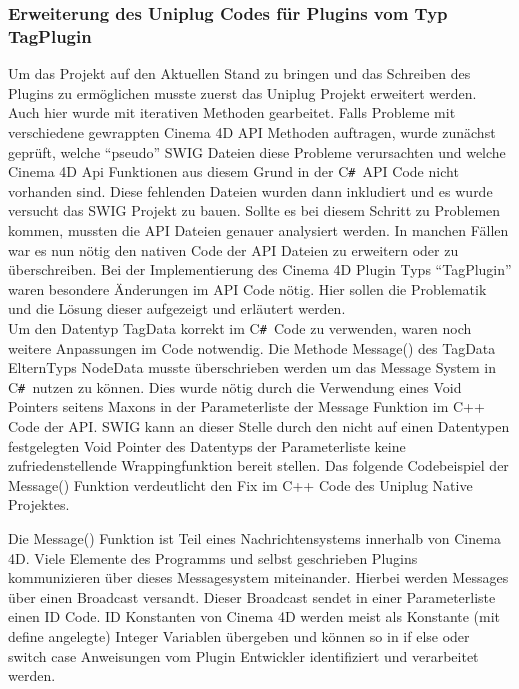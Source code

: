 \documentclass[pagesize, paper=a4, fontsize=12pt, titlepage=true, headings=small, headnosepline, abstractoff, liststotoc, nochapterprefix, plainheadsepline, twoside]{scrreprt}
\newcommand{\CSS}{C\texttt{\# }}
\begin{document}
\subsubsection{Erweiterung des Uniplug Codes für Plugins vom Typ TagPlugin}
Um das Projekt auf den Aktuellen Stand zu bringen und das Schreiben des Plugins zu ermöglichen musste zuerst das Uniplug Projekt erweitert werden. Auch hier wurde mit iterativen Methoden gearbeitet. Falls Probleme mit verschiedene gewrappten Cinema 4D API Methoden auftragen, wurde zunächst geprüft, welche “pseudo” SWIG Dateien diese Probleme verursachten und welche Cinema 4D Api Funktionen aus diesem Grund in der \CSS API Code nicht vorhanden sind. Diese fehlenden Dateien wurden dann inkludiert und es wurde versucht das SWIG Projekt zu bauen. Sollte es bei diesem Schritt zu Problemen kommen, mussten die API Dateien genauer analysiert werden. In manchen Fällen war es nun nötig den nativen Code der API Dateien zu erweitern oder zu überschreiben. Bei der Implementierung des Cinema 4D Plugin Typs “TagPlugin” waren besondere Änderungen im API Code nötig. Hier sollen die Problematik und die Lösung dieser aufgezeigt und erläutert werden.
\\


Um den Datentyp TagData korrekt im \CSS Code zu verwenden, waren noch weitere Anpassungen im Code notwendig. Die Methode Message() des TagData ElternTyps NodeData musste überschrieben werden um das Message System in \CSS nutzen zu können. Dies wurde nötig durch die Verwendung eines Void Pointers seitens Maxons in der Parameterliste der Message Funktion im C++ Code der API. SWIG kann an dieser Stelle durch den nicht auf einen Datentypen festgelegten Void Pointer des Datentyps der Parameterliste keine zufriedenstellende Wrappingfunktion bereit stellen. Das folgende Codebeispiel der Message() Funktion verdeutlicht den Fix im C++ Code des Uniplug Native Projektes.

Die Message() Funktion ist Teil eines Nachrichtensystems innerhalb von Cinema 4D. Viele Elemente des Programms und selbst geschrieben Plugins kommunizieren über dieses Messagesystem miteinander. Hierbei werden Messages über einen Broadcast versandt. Dieser Broadcast sendet in einer Parameterliste einen ID Code. ID Konstanten von Cinema 4D werden meist als Konstante (mit define angelegte) Integer Variablen übergeben und können so in if else oder switch case Anweisungen vom Plugin Entwickler identifiziert und verarbeitet werden.
\end{document}

